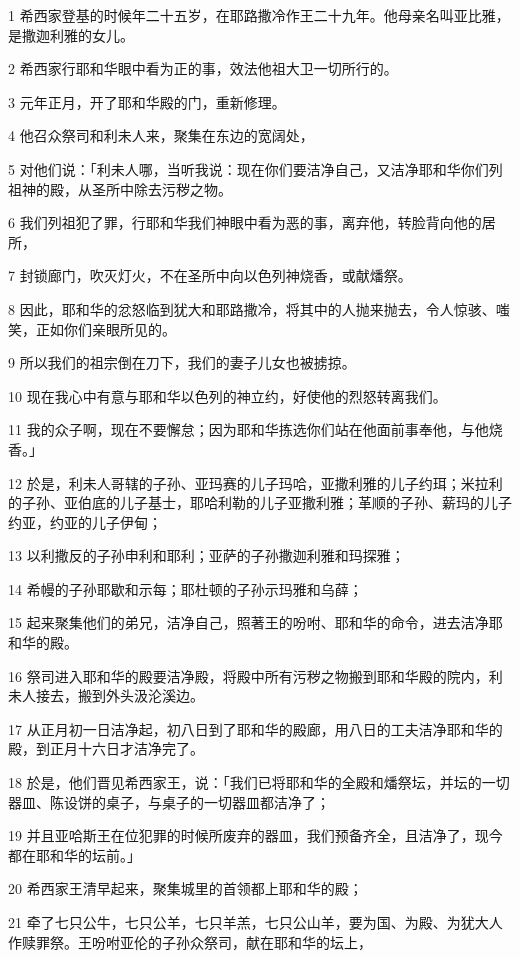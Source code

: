 \par 1 希西家登基的时候年二十五岁，在耶路撒冷作王二十九年。他母亲名叫亚比雅，是撒迦利雅的女儿。
\par 2 希西家行耶和华眼中看为正的事，效法他祖大卫一切所行的。
\par 3 元年正月，开了耶和华殿的门，重新修理。
\par 4 他召众祭司和利未人来，聚集在东边的宽阔处，
\par 5 对他们说：「利未人哪，当听我说：现在你们要洁净自己，又洁净耶和华你们列祖神的殿，从圣所中除去污秽之物。
\par 6 我们列祖犯了罪，行耶和华我们神眼中看为恶的事，离弃他，转脸背向他的居所，
\par 7 封锁廊门，吹灭灯火，不在圣所中向以色列神烧香，或献燔祭。
\par 8 因此，耶和华的忿怒临到犹大和耶路撒冷，将其中的人抛来抛去，令人惊骇、嗤笑，正如你们亲眼所见的。
\par 9 所以我们的祖宗倒在刀下，我们的妻子儿女也被掳掠。
\par 10 现在我心中有意与耶和华以色列的神立约，好使他的烈怒转离我们。
\par 11 我的众子啊，现在不要懈怠；因为耶和华拣选你们站在他面前事奉他，与他烧香。」
\par 12 於是，利未人哥辖的子孙、亚玛赛的儿子玛哈，亚撒利雅的儿子约珥；米拉利的子孙、亚伯底的儿子基士，耶哈利勒的儿子亚撒利雅；革顺的子孙、薪玛的儿子约亚，约亚的儿子伊甸；
\par 13 以利撒反的子孙申利和耶利；亚萨的子孙撒迦利雅和玛探雅；
\par 14 希幔的子孙耶歇和示每；耶杜顿的子孙示玛雅和乌薛；
\par 15 起来聚集他们的弟兄，洁净自己，照著王的吩咐、耶和华的命令，进去洁净耶和华的殿。
\par 16 祭司进入耶和华的殿要洁净殿，将殿中所有污秽之物搬到耶和华殿的院内，利未人接去，搬到外头汲沦溪边。
\par 17 从正月初一日洁净起，初八日到了耶和华的殿廊，用八日的工夫洁净耶和华的殿，到正月十六日才洁净完了。
\par 18 於是，他们晋见希西家王，说：「我们已将耶和华的全殿和燔祭坛，并坛的一切器皿、陈设饼的桌子，与桌子的一切器皿都洁净了；
\par 19 并且亚哈斯王在位犯罪的时候所废弃的器皿，我们预备齐全，且洁净了，现今都在耶和华的坛前。」
\par 20 希西家王清早起来，聚集城里的首领都上耶和华的殿；
\par 21 牵了七只公牛，七只公羊，七只羊羔，七只公山羊，要为国、为殿、为犹大人作赎罪祭。王吩咐亚伦的子孙众祭司，献在耶和华的坛上，
